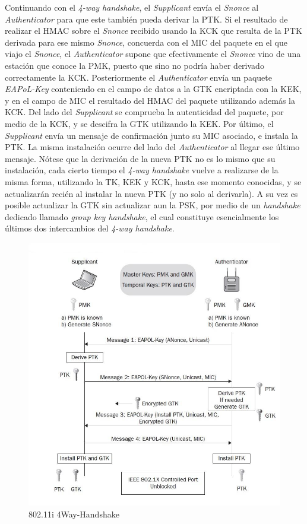 \documentclass[10pt,a4paper]{article}
\begin{document}
Continuando con el \textit{4-way handshake}, el \textit{Supplicant} envía el \textit{Snonce} al \textit{Authenticator} para que este también pueda derivar la PTK. Si el resultado de realizar el HMAC sobre el \textit{Snonce} recibido usando la KCK que resulta de la PTK derivada para ese mismo \textit{Snonce}, concuerda con el MIC del paquete en el que viajo el \textit{Snonce}, el \textit{Authenticator} supone que efectivamente el \textit{Snonce} vino de una estación que conoce la PMK, puesto que sino no podría haber derivado correctamente la KCK. Posteriormente el \textit{Authenticator} envía un paquete \textit{EAPoL-Key} conteniendo en el campo de datos a la GTK encriptada con la KEK, y en el campo de MIC el resultado del HMAC del paquete utilizando además la KCK. Del lado del \textit{Supplicant} se comprueba la autenticidad del paquete, por medio de la KCK, y se descifra la GTK utilizando la KEK. Por último, el \textit{Supplicant} envía un mensaje de confirmación junto su MIC asociado, e instala la PTK. La misma instalación ocurre del lado del \textit{Authenticator} al llegar ese último mensaje. Nótese que la derivación de la nueva PTK no es lo mismo que su instalación, cada cierto tiempo el \textit{4-way handshake} vuelve a realizarse de la misma forma, utilizando la TK, KEK y KCK, hasta ese momento conocidas, y se actualizarán recién al instalar la nueva PTK (y no solo al derivarla). A su vez es posible actualizar la GTK sin actualizar aun la PSK, por medio de un \textit{handshake} dedicado llamado \textit{group key handshake}, el cual constituye esencialmente los últimos dos intercambios del \textit{4-way handshake}.

\begin{figure}[H]
\centerline{\includegraphics[scale=0.5]{images/4Way-Handshake.jpg}}
\caption{802.11i 4Way-Handshake}
\end{figure}
\end{document}

